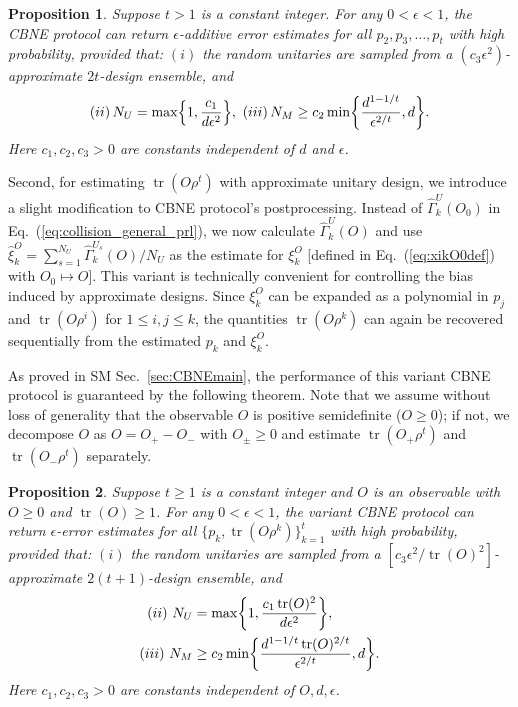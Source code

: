 \documentclass[aps,prl,twocolumn,nofootinbib,superscriptaddress,10pt]{revtex4-2}
\let\originalleft\left
\let\originalright\right
\renewcommand{\left}{\mathopen{}\mathclose\bgroup\originalleft}
\renewcommand{\right}{\aftergroup\egroup\originalright}
\DeclareMathOperator{\Tr}{tr}
\theoremstyle{plain}
\newtheorem{prop}{Proposition}
\theoremstyle{definition}
\newcommand{\eref}[1]{Eq.~\textup{(\ref{#1})}}
\begin{document}
\begin{prop}\label{prop:appCBNEmoment}
Suppose $t>1$ is a constant integer. For any $0<\epsilon<1$, 
the CBNE protocol can return $\epsilon$-additive error estimates for all 
$p_2,p_3,\dots,p_t$ with high probability, provided that: $(i)$ the random unitaries are sampled from a $(c_3\epsilon^2)$-approximate $2t$-design ensemble, and 
\begin{align}\label{eq:MomResultApp}
(ii) \, N_U= \max\left\lbrace 1, \dfrac{c_1}{d\epsilon^2} \right\rbrace ,  
\ 
(iii) \, N_M\geq  c_2  \min\left\lbrace \frac{d^{1-1/t}}{\epsilon^{2/t}}, d \right\rbrace.     
\end{align}
Here $c_1,c_2,c_3>0$ are constants  independent of $d$ and $\epsilon$. 
\end{prop}


Second, for estimating $\Tr(O\rho^t)$ with approximate unitary design, we introduce a slight modification to CBNE protocol's postprocessing. 
Instead of $\hat{\Gamma}_k^U(O_0)$ in \eref{eq:collision_general_prl}, we now calculate $\hat{\Gamma}_k^U(O)$ and use $\hat\xi_k^{O}=\sum_{s=1}^{N_U} \hat{\Gamma}_k^{U_{\!s}}(O)/N_U$ as the estimate for $\xi_k^{O}$ [defined in \eref{eq:xikO0def} with $O_0 \mapsto O$]. This variant is technically convenient for controlling the bias induced by approximate designs. 
Since \(\xi^O_k\) can be expanded as a polynomial in \(p_j\) and \(\Tr(O\rho^i)\) for \(1\le i,j\le k\), the quantities \(\Tr(O\rho^k)\) can again be recovered sequentially from the estimated \(p_k\) and \(\xi^O_k\).


As proved in SM Sec.~\ref{sec:CBNEmain}, the performance of this variant CBNE protocol is guaranteed by the following theorem. Note that we assume without loss of generality that the observable $O$ is positive semidefinite ($O\geq0$); if not, we decompose $O$ as $O = O_+ - O_-$ with $O_\pm \geq0$ and estimate $\Tr(O_+\rho^t)$ and $\Tr(O_-\rho^t)$ separately. 


\begin{prop}\label{prop:appCBNE}
Suppose $t\geq1$ is a constant integer and $O$ is an observable with $O\geq 0$ and $\Tr(O)\geq1$. 
For any $0<\epsilon<1$, the variant CBNE protocol can return $\epsilon$-error estimates for all 
$\big\{p_k,\Tr(O\rho^k)\big\}_{k=1}^t$ with high probability, provided that: 
$(i)$ the random unitaries are sampled from a $[c_3\epsilon^2\!/\!\Tr(O)^2]$-approximate $2(t+1)$-design ensemble, and 
\begin{align}
{(ii)} \ N_U &= \max\left\lbrace 1, \dfrac{c_1 \Tr(O)^2}{d\epsilon^2} \right\rbrace, 
\\
{(iii)} \ N_M &\geq  c_2  \min\left\{ \frac{d^{1-1/t}\Tr(O)^{2/t}}{\epsilon^{2/t}}, d \right\}.  
\end{align}
Here $c_1,c_2,c_3>0$ are constants  independent of $O,d,\epsilon$. 
\end{prop}
\end{document}
